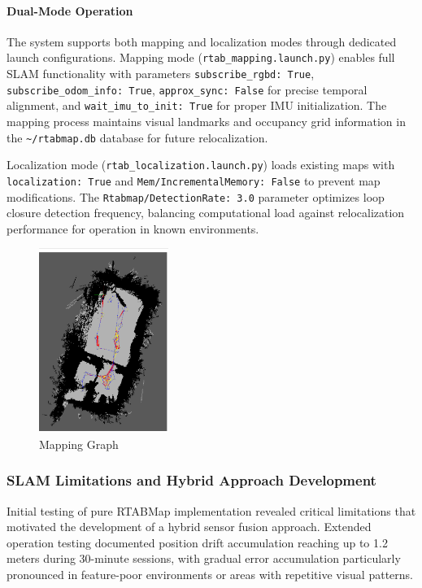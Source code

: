 \paragraph{Dual-Mode Operation}

The system supports both mapping and localization modes through dedicated launch configurations. Mapping mode (\texttt{rtab\_mapping.launch.py}) enables full SLAM functionality with parameters \texttt{subscribe\_rgbd: True}, \linebreak\texttt{subscribe\_odom\_info: True}, \texttt{approx\_sync: False} for precise temporal alignment, and \texttt{wait\_imu\_to\_init: True} for proper IMU initialization. The mapping process maintains visual landmarks and occupancy grid information in the \texttt{\textasciitilde/rtabmap.db} database for future relocalization.

Localization mode (\texttt{rtab\_localization.launch.py}) loads existing maps with \linebreak\texttt{localization: True} and \texttt{Mem/IncrementalMemory: False} to prevent map modifications. The \texttt{Rtabmap/DetectionRate: 3.0} parameter optimizes loop closure detection frequency, balancing computational load against relocalization performance for operation in known environments.

\begin{figure}[H]
    \centering
    \includegraphics[height=6cm]{Images/mapping graph.png}
    \caption{Mapping Graph}
    \label{fig:mapping_graph}
\end{figure}

\subsubsection{SLAM Limitations and Hybrid Approach Development}

Initial testing of pure RTABMap implementation revealed critical limitations that motivated the development of a hybrid sensor fusion approach. Extended operation testing documented position drift accumulation reaching up to 1.2 meters during 30-minute sessions, with gradual error accumulation particularly pronounced in feature-poor environments or areas with repetitive visual patterns.

